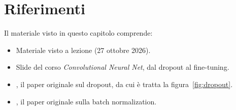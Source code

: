 \section*{Riferimenti}
Il materiale visto in questo capitolo comprende:
\begin{itemize}
    \item Materiale visto a lezione (27 ottobre 2026).
    \item Slide del corso \emph{Convolutional Neural Net}, dal dropout al fine-tuning.
    \item {} \cite{Srivastava2014}, il paper originale sul dropout, da cui è tratta la figura~\ref{fig:dropout}.
    \item {} \cite{Ioffe2015}, il paper originale sulla batch normalization.
\end{itemize}
